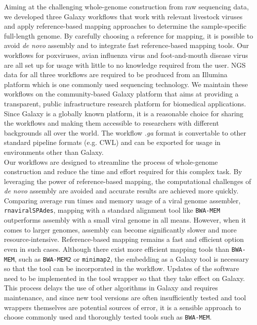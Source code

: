 Aiming at the challenging whole-genome construction from raw sequencing data, we developed three Galaxy workflows that work with relevant livestock viruses and apply reference-based mapping approaches to determine the sample-specific full-length genome. By carefully choosing a reference for mapping, it is possible to avoid \textit{de novo} assembly and to integrate fast reference-based mapping tools. Our workflows for poxviruses, avian influenza virus and foot-and-mouth disease virus are all set up for usage with little to no knowledge required from the user. \ac{NGS} data for all three workflows are required to be produced from an Illumina platform which is one commonly used sequencing technology. We maintain these workflows on the community-based Galaxy platform that aims at providing a transparent, public infrastructure research platform for biomedical applications. Since Galaxy is a globally known platform, it is a reasonable choice for sharing the workflows and making them accessible to researchers with different backgrounds all over the world. The workflow \textit{.ga} format is convertable to other standard pipeline formats (e.g. \ac{CWL}) and can be exported for usage in environments other than Galaxy.\\
Our workflows are designed to streamline the process of whole-genome construction and reduce the time and effort required for this complex task. By leveraging the power of reference-based mapping, the computational challenges of \textit{de novo} assembly are avoided and accurate results are achieved more quickly. Comparing average run times and memory usage of a viral genome assembler, \texttt{rnaviralSPAdes}, mapping with a standard alignment tool like \texttt{BWA-MEM} outperforms assembly with a small viral genome in all means. However, when it comes to larger genomes, assembly can become significantly slower and more resource-intensive. Reference-based mapping remains a fast and efficient option even in such cases. Although there exist more efficient mapping tools than \texttt{BWA-MEM}, such as \texttt{BWA-MEM2} or \texttt{minimap2}, the embedding as a Galaxy tool is necessary so that the tool can be incorporated in the workflow. Updates of the software need to be implemented in the tool wrapper so that they take effect on Galaxy. This process delays the use of other algorithms in Galaxy and requires maintenance, and since new tool versions are often insufficiently tested and tool wrappers themselves are potential sources of error, it is a sensible approach to choose commonly used and thoroughly tested tools such as \texttt{BWA-MEM}.\\
